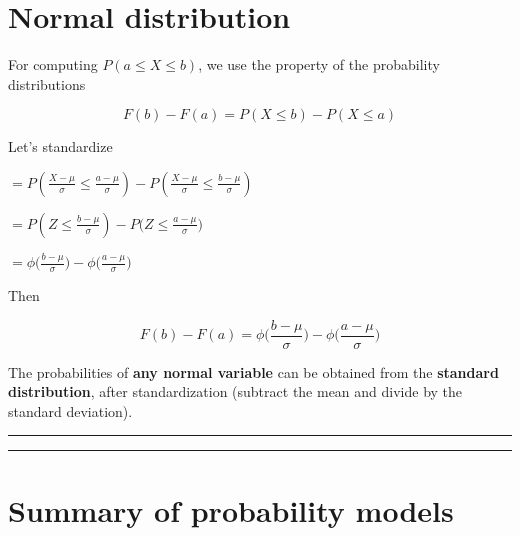 \documentclass[
]{book}
\begin{document}
\hypertarget{normal-distribution-7}{%
\section{Normal distribution}\label{normal-distribution-7}}

For computing \(P(a\leq X \leq b)\), we use the property of the probability distributions

\[F(b)-F(a)=P(X\leq b)-P(X\leq a)\]

Let's standardize

\(=P(\frac{X-\mu}{\sigma}\leq \frac{a-\mu}{\sigma})-P(\frac{X-\mu}{\sigma}\leq \frac{b-\mu}{\sigma})\)

\(=P(Z \leq \frac{b-\mu}{\sigma})-P(Z \leq \frac{a-\mu}{\sigma}\big)\)

\(=\phi \big(\frac{b-\mu}{\sigma}\big)-\phi \big(\frac{a-\mu}{\sigma}\big)\)

Then

\[F(b)-F(a)=\phi \big(\frac{b-\mu}{\sigma}\big)-\phi \big(\frac{a-\mu}{\sigma}\big)\]

The probabilities of \textbf{any normal variable} can be obtained from the \textbf{standard distribution}, after standardization (subtract the mean and divide by the standard deviation).

\begin{center}\rule{0.5\linewidth}{0.5pt}\end{center}

\begin{center}\rule{0.5\linewidth}{0.5pt}\end{center}

\hypertarget{summary-of-probability-models-2}{%
\section{Summary of probability models}\label{summary-of-probability-models-2}}
\end{document}
